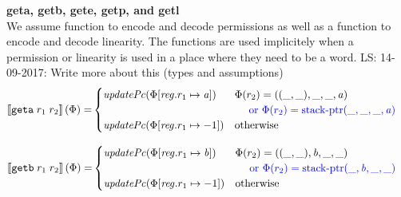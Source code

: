 \documentclass[a4paper]{article}
\newcommand\lau[1]{{\color{purple} \sf \footnotesize {LS: #1}}\\}
\newcommand{\sem}[1]{\left\llbracket #1 \right\rrbracket}
\newcommand{\tor}{\text{ or }}
\newcommand{\totherwise}{\text{otherwise }}
\newcommand{\sourcecolor}[1]{\color{blue}}
\newcommand{\src}[1]{{\sourcecolor{} #1}}
\newcommand{\targetcolor}[1]{\color{black}}
\newcommand{\trg}[1]{{\targetcolor{} #1}}
\newcommand{\zinstr}[1]{\texttt{#1}}
\newcommand{\twoinstr}[3]{
  \ifthenelse{\equal{#2#3}{}}
  {\zinstr{#1}}
  {\zinstr{#1} \; #2 \; #3}
}
\newcommand{\tgeta}[2]{\twoinstr{\trg{geta}}{#1}{#2}}
\newcommand{\tgetb}[2]{\twoinstr{\trg{getb}}{#1}{#2}}
\newcommand{\update}[2]{[#1 \mapsto #2]}
\newcommand{\updReg}[2]{\update{\reg.#1}{#2}}
\newcommand{\stkptr}[1]{\mathrm{stack\text{-}ptr}(#1)}
\newcommand{\var}[1]{\mathit{#1}}
\newcommand{\reg}{\var{reg}}
\newcommand{\baddr}{\var{b}}
\newcommand{\aaddr}{\var{a}}
\newcommand{\plainfun}[2]{
  \ifthenelse{\equal{#2}{}}
  {\mathit{#1}}
  {\mathit{#1}(#2)}
}
\newcommand{\updPcAddr}[1]{\plainfun{updatePc}{#1}}
\begin{document}
\noindent\textbf{geta, getb, gete, getp, and getl}\\
We assume function to encode and decode permissions as well as a function to encode and decode linearity. The functions are used implicitely when a permission or linearity is used in a place where they need to be a word.
\lau{14-09-2017: Write more about this (types and assumptions)}
\begin{align*}
  \sem{\tgeta{r_1}{r_2}}(\Phi) = & 
                                   \begin{cases}
                                     \updPcAddr{\Phi\updReg{r_1}{\aaddr}} & 
                                     \arraycolsep=0pt
                                     \begin{array}[t]{l}
                                       \Phi(r_2) = ((\_,\_),\_,\_,\aaddr) \\
                                       \quad \src{\tor \Phi(r_2) = \stkptr{\_,\_,\_,\aaddr} } \\
                                     \end{array} \\
                                     \updPcAddr{\Phi\updReg{r_1}{-1}} & \totherwise
                                   \end{cases}
\end{align*}

\begin{align*}
  \sem{\tgetb{r_1}{r_2}}(\Phi) = & 
                                   \begin{cases}
                                     \updPcAddr{\Phi\updReg{r_1}{\baddr}} & 
                                     \arraycolsep=0pt
                                     \begin{array}[t]{l}
                                       \Phi(r_2) = ((\_,\_),\baddr,\_,\_) \\
                                       \quad \src{\tor \Phi(r_2) = \stkptr{\_,\baddr,\_,\_} } \\
                                     \end{array} \\
                                     \updPcAddr{\Phi\updReg{r_1}{-1}} & \totherwise
                                   \end{cases}
\end{align*}
\end{document}
